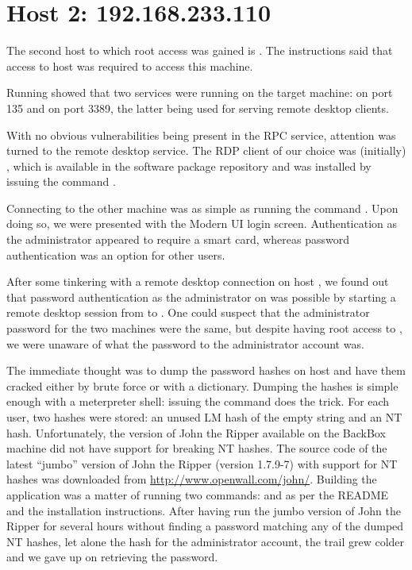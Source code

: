 \section*{Host 2: 192.168.233.110}
The second host to which root access was gained is . The instructions said that access to host  was required to access this machine.

Running  showed that two services were running on the target machine:  on port 135 and  on port 3389, the latter being used for serving remote desktop clients.

With no obvious vulnerabilities being present in the RPC service, attention was turned to the remote desktop service. The RDP client of our choice was (initially) , which is available in the software package repository and was installed by issuing the command .

Connecting to the other machine was as simple as running the command . Upon doing so, we were presented with the Modern UI login screen. Authentication as the administrator appeared to require a smart card, whereas password authentication was an option for other users.

After some tinkering with a remote desktop connection on host , we found out that password authentication as the administrator on  was possible by starting a remote desktop session from  to . One could suspect that the administrator password for the two machines were the same, but despite having root access to , we were unaware of what the password to the administrator account was.

The immediate thought was to dump the password hashes on host  and have them cracked either by brute force or with a dictionary. Dumping the hashes is simple enough with a meterpreter shell: issuing the command  does the trick. For each user, two hashes were stored: an unused LM hash of the empty string and an NT hash. Unfortunately, the version of John the Ripper available on the BackBox machine did not have support for breaking NT hashes. The source code of the latest ``jumbo'' version of John the Ripper (version 1.7.9-7) with support for NT hashes was downloaded from \url{http://www.openwall.com/john/}. Building the application was a matter of running two  commands:  and  as per the README and the installation instructions. After having run the jumbo version of John the Ripper for several hours without finding a password matching any of the dumped NT hashes, let alone the hash for the administrator account, the trail grew colder and we gave up on retrieving the password.

